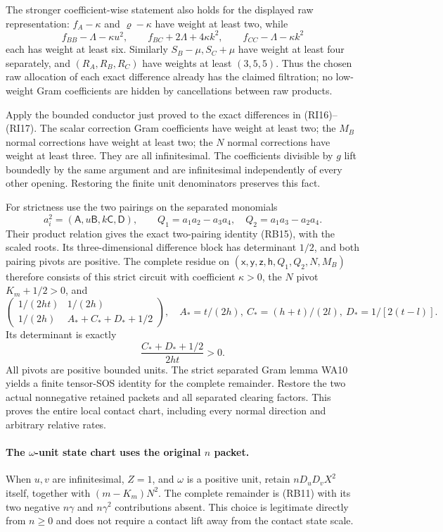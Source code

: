 The stronger coefficient-wise statement also holds for the displayed
raw representation: $f_A-\kappa$ and $\varrho-\kappa$ have weight at
least two, while
\[
 f_{BB}-\Lambda-\kappa u^2,\qquad
 f_{BC}+2\Lambda+4\kappa k^2,\qquad
 f_{CC}-\Lambda-\kappa k^2
\]
each has weight at least six. Similarly $S_B-\mu,S_C+\mu$ have
weight at least four separately, and $(R_A,R_B,R_C)$ have weights
at least $(3,5,5)$. Thus the chosen raw allocation of each exact
difference already has the claimed filtration; no low-weight
Gram coefficients are hidden by cancellations between raw products.

Apply the bounded conductor just proved to the exact differences in
(RI16)--(RI17). The scalar correction Gram coefficients have weight
at least two; the $M_B$ normal corrections have weight at least two;
the $N$ normal corrections have weight at least three. They are all
infinitesimal. The coefficients divisible by $g$ lift boundedly by the
same argument and are infinitesimal independently of every other
opening. Restoring the finite unit denominators preserves this fact.

For strictness use the two pairings on the separated monomials
\[
 a_i^2=(\mathsf A,u\mathsf B,k\mathsf C,\mathsf D),\qquad
 Q_1=a_1a_2-a_3a_4,\quad Q_2=a_1a_3-a_2a_4.
\]
Their product relation gives the exact two-pairing identity (RB15),
with the scaled roots. Its three-dimensional difference block has
determinant $1/2$, and both pairing pivots are positive. The complete
residue on
$(\mathsf x,\mathsf y,\mathsf z,\mathsf h,Q_1,Q_2,N,M_B)$
therefore consists of this strict circuit with coefficient
$\kappa>0$, the $N$ pivot $K_m+1/2>0$, and
\[
 \begin{pmatrix}
 1/(2ht)&1/(2h)\\
 1/(2h)&A_*+C_*+D_*+1/2
 \end{pmatrix},
 \quad A_*=t/(2h),\ C_*=(h+t)/(2l),\ D_*=1/[2(t-l)].
 \tag{RI19}
\]
Its determinant is exactly
\[
 \frac{C_*+D_*+1/2}{2ht}>0.                         \tag{RI20}
\]
All pivots are positive bounded units. The strict separated Gram
lemma WA10 yields a finite tensor-SOS identity for the complete
remainder. Restore the two actual nonnegative retained packets and
all separated clearing factors. This proves the entire local contact
chart, including every normal direction and arbitrary relative rates.

\paragraph{The $\omega$-unit state chart uses the original $n$ packet.}
When $u,v$ are infinitesimal, $Z=1$, and $\omega$ is a positive unit,
retain $nD_uD_vX^2$ itself, together with $(m-K_m)N^2$.
The complete remainder is (RB11) with its two negative $n\gamma$
and $n\gamma^2$ contributions absent. This choice is legitimate
directly from $n\geq0$ and does not require a contact lift away from
the contact state scale.

